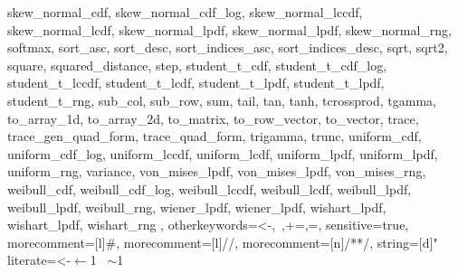 {{    skew_normal_cdf,%
    skew_normal_cdf_log,%
    skew_normal_lccdf,%
    skew_normal_lcdf,%
    skew_normal_lpdf,%
    skew_normal_lpdf,%
    skew_normal_rng,%
    softmax,%
    sort_asc,%
    sort_desc,%
    sort_indices_asc,%
    sort_indices_desc,%
    sqrt,%
    sqrt2,%
    square,%
    squared_distance,%
    step,%
    student_t_cdf,%
    student_t_cdf_log,%
    student_t_lccdf,%
    student_t_lcdf,%
    student_t_lpdf,%
    student_t_lpdf,%
    student_t_rng,%
    sub_col,%
    sub_row,%
    sum,%
    tail,%
    tan,%
    tanh,%
    tcrossprod,%
    tgamma,%
    to_array_1d,%
    to_array_2d,%
    to_matrix,%
    to_row_vector,%
    to_vector,%
    trace,%
    trace_gen_quad_form,%
    trace_quad_form,%
    trigamma,%
    trunc,%
    uniform_cdf,%
    uniform_cdf_log,%
    uniform_lccdf,%
    uniform_lcdf,%
    uniform_lpdf,%
    uniform_lpdf,%
    uniform_rng,%
    variance,%
    von_mises_lpdf,%
    von_mises_lpdf,%
    von_mises_rng,%
    weibull_cdf,%
    weibull_cdf_log,%
    weibull_lccdf,%
    weibull_lcdf,%
    weibull_lpdf,%
    weibull_lpdf,%
    weibull_rng,%
    wiener_lpdf,%
    wiener_lpdf,%
    wishart_lpdf,%
    wishart_lpdf,%
    wishart_rng
  },%
  otherkeywords={<-,~,+=,=},%
  sensitive=true,%
  morecomment=[l]{\#},%
  morecomment=[l]{//},%
  morecomment=[n]{/*}{*/},%
  string=[d]"%
  literate={<-}{{$\leftarrow$}}1 {~}{{$\sim$}}1%
}
